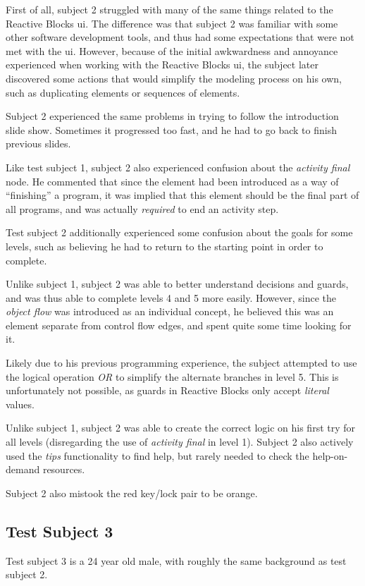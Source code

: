 \noindent
First of all, subject 2 struggled with many of the same things related to the Reactive Blocks \gls{ui}. The difference was that subject 2 was familiar with some other software development tools, and thus had some expectations that were not met with the \gls{ui}. However, because of the initial awkwardness and annoyance experienced when working with the Reactive Blocks \gls{ui}, the subject later discovered some actions that would simplify the modeling process on his own, such as duplicating elements or sequences of elements.

\noindent
Subject 2 experienced the same problems in trying to follow the introduction slide show. Sometimes it progressed too fast, and he had to go back to finish previous slides.

\noindent
Like test subject 1, subject 2 also experienced confusion about the \emph{activity final} node. He commented that since the element had been introduced as a way of ``finishing'' a program, it was implied that this element should be the final part of all programs, and was actually \emph{required} to end an activity step.

\noindent
Test subject 2 additionally experienced some confusion about the goals for some levels, such as believing he had to return to the starting point in order to complete.

\noindent
Unlike subject 1, subject 2 was able to better understand decisions and guards, and was thus able to complete levels 4 and 5 more easily. However, since the \emph{object flow} was introduced as an individual concept, he believed this was an element separate from control flow edges, and spent quite some time looking for it.

\noindent
Likely due to his previous programming experience, the subject attempted to use the logical operation \emph{OR} to simplify the alternate branches in level 5. This is unfortunately not possible, as guards in Reactive Blocks only accept \emph{literal} values.

\noindent
Unlike subject 1, subject 2 was able to create the correct logic on his first try for all levels (disregarding the use of \emph{activity final} in level 1). Subject 2 also actively used the \emph{tips} functionality to find help, but rarely needed to check the help-on-demand resources.

\noindent
Subject 2 also mistook the red key/lock pair to be orange.

\subsection{Test Subject 3}
\label{sec:game_testing_subject3}
Test subject 3 is a 24 year old male, with roughly the same background as test subject 2.

